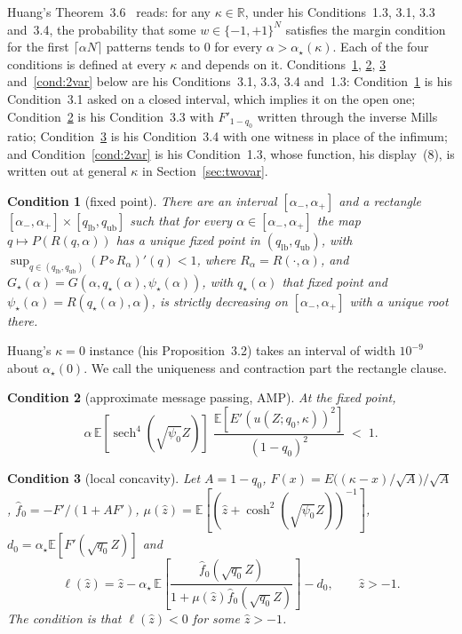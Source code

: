 \documentclass[11pt]{article}
\newtheorem{cond}{Condition}
\theoremstyle{remark}
\newcommand{\E}{\mathbb{E}}
\newcommand{\R}{\mathbb{R}}
\DeclareMathOperator{\sech}{sech}
\begin{document}
Huang's Theorem~3.6~\cite{huang2024capacity} reads: for any
$\kappa\in\R$, under his Conditions~1.3, 3.1, 3.3 and~3.4, the
probability that some $w\in\{-1,+1\}^N$ satisfies the margin
condition for the first $\lceil\alpha N\rceil$ patterns tends to $0$ for every
$\alpha>\alpha_\star(\kappa)$.  Each of the four conditions is
defined at every $\kappa$ and depends on it.  Conditions~\ref{cond:fp},
\ref{cond:amp}, \ref{cond:lc} and~\ref{cond:2var} below are his
Conditions~3.1, 3.3, 3.4 and~1.3: Condition~\ref{cond:fp} is his
Condition~3.1 asked on a closed interval, which implies it on the open
one; Condition~\ref{cond:amp} is his Condition~3.3 with
$F'_{1-q_0}$ written through the inverse Mills ratio;
Condition~\ref{cond:lc} is his Condition~3.4 with one witness in place
of the infimum; and Condition~\ref{cond:2var} is his Condition~1.3,
whose function, his display~(8), is written out at general $\kappa$ in
Section~\ref{sec:twovar}.

\begin{cond}[fixed point]\label{cond:fp}
There are an interval $[\alpha_-,\alpha_+]$ and a rectangle
$[\alpha_-,\alpha_+]\times[q_{\mathrm{lb}},q_{\mathrm{ub}}]$ such that
for every $\alpha\in[\alpha_-,\alpha_+]$ the map $q\mapsto
P(R(q,\alpha))$ has a unique fixed point in
$(q_{\mathrm{lb}},q_{\mathrm{ub}})$, with
$\sup_{q\in(q_{\mathrm{lb}},q_{\mathrm{ub}})}(P\circ R_\alpha)'(q)<1$,
where $R_\alpha=R(\cdot,\alpha)$,
and $G_\star(\alpha)=G(\alpha,q_\star(\alpha),\psi_\star(\alpha))$,
with $q_\star(\alpha)$ that fixed point and
$\psi_\star(\alpha)=R(q_\star(\alpha),\alpha)$, is strictly decreasing
on $[\alpha_-,\alpha_+]$ with a unique root there.
\end{cond}

Huang's $\kappa=0$ instance (his Proposition~3.2) takes an interval of
width $10^{-9}$ about $\alpha_\star(0)$.  We call the uniqueness and
contraction part the rectangle clause.

\begin{cond}[approximate message passing, AMP]\label{cond:amp}
At the fixed point,
\[
\alpha\,\E[\sech^4(\sqrt{\psi_0}Z)]\;
\frac{\E[E'(u(Z;q_0,\kappa))^2]}{(1-q_0)^2}\;<\;1.
\]
\end{cond}

\begin{cond}[local concavity]\label{cond:lc}
Let $A=1-q_0$, $F(x)=E\bigl((\kappa-x)/\sqrt A\bigr)/\sqrt A$,
$\hat f_0=-F'/(1+AF')$,
$\mu(\hat z)=\E[(\hat z+\cosh^2(\sqrt{\psi_0}Z))^{-1}]$,
$d_0=\alpha_\star\E[F'(\sqrt{q_0}Z)]$ and
\[
\ell(\hat z)=\hat z-\alpha_\star\,\E\!\left[\frac{\hat f_0(\sqrt{q_0}Z)}
{1+\mu(\hat z)\hat f_0(\sqrt{q_0}Z)}\right]-d_0,\qquad \hat z>-1.
\]
The condition is that $\ell(\hat z)<0$ for some $\hat z>-1$.
\end{cond}
\end{document}
